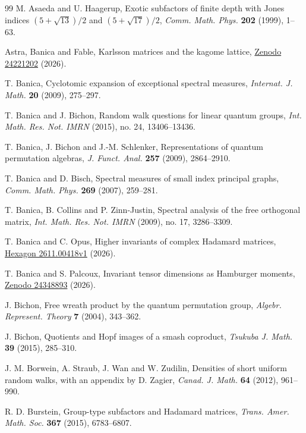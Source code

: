\documentclass[11pt,reqno]{amsart}
\theoremstyle{definition}
\numberwithin{equation}{section}
\begin{document}
\begin{thebibliography}{99}
\hypersetup{urlcolor=black}
M. Asaeda and U. Haagerup, Exotic subfactors of finite depth with Jones indices $(5+\sqrt{13})/2$ and $(5+\sqrt{17})/2$, {\em Comm. Math. Phys.} {\bf 202} (1999), 1--63.

Astra, Banica and Fable, Karlsson matrices and the kagome lattice, \href{https://zenodo.org/records/24221202}{Zenodo 24221202} (2026).

T. Banica, Cyclotomic expansion of exceptional spectral measures, {\em Internat. J. Math.} {\bf 20} (2009), 275--297.

T. Banica and J. Bichon, Random walk questions for linear quantum groups, {\em Int. Math. Res. Not. IMRN} (2015), no. 24, 13406--13436.

T. Banica, J. Bichon and J.-M. Schlenker, Representations of quantum permutation algebras, {\em J. Funct. Anal.} {\bf 257} (2009), 2864--2910.

T. Banica and D. Bisch, Spectral measures of small index principal graphs, {\em Comm. Math. Phys.} {\bf 269} (2007), 259--281.

T. Banica, B. Collins and P. Zinn-Justin, Spectral analysis of the free orthogonal matrix, {\em Int. Math. Res. Not. IMRN} (2009), no. 17, 3286--3309.

T. Banica and C. Opus, Higher invariants of complex Hadamard matrices, \href{https://hexagonmath.org/2611.00418v1}{Hexagon 2611.00418v1} (2026).

T. Banica and S. Palcoux, Invariant tensor dimensions as Hamburger moments, \href{https://zenodo.org/records/24348893}{Zenodo 24348893} (2026).

J. Bichon, Free wreath product by the quantum permutation group, {\em Algebr. Represent. Theory} {\bf 7} (2004), 343--362.

J. Bichon, Quotients and Hopf images of a smash coproduct, {\em Tsukuba J. Math.} {\bf 39} (2015), 285--310.

J. M. Borwein, A. Straub, J. Wan and W. Zudilin, Densities of short uniform random walks, with an appendix by D. Zagier, {\em Canad. J. Math.} {\bf 64} (2012), 961--990.

R. D. Burstein, Group-type subfactors and Hadamard matrices, {\em Trans. Amer. Math. Soc.} {\bf 367} (2015), 6783--6807.


\end{thebibliography}
\end{document}
